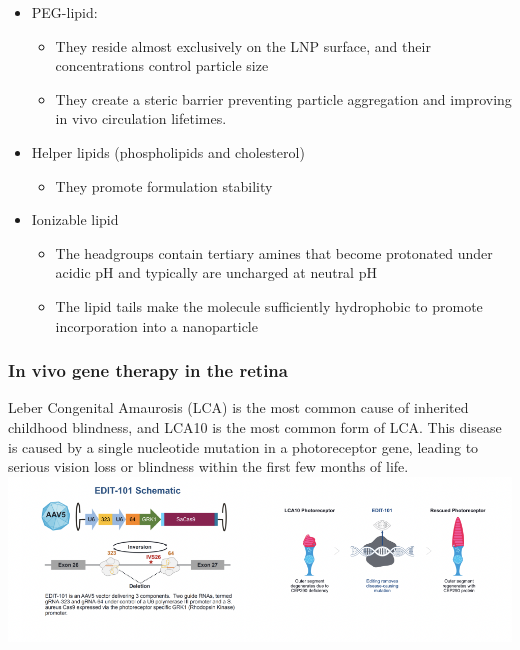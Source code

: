 \begin{itemize}
\begin{itemize}
\begin{itemize}
    \item PEG-lipid:
    \begin{itemize}
        \item They reside almost exclusively on the LNP surface, and
their concentrations control particle size
\item They create a steric barrier preventing particle
aggregation and improving in vivo circulation lifetimes.
    \end{itemize}
    \item Helper lipids (phospholipids and cholesterol)
    \begin{itemize}
        \item 
They promote formulation stability

    \end{itemize}
    \item Ionizable lipid
    \begin{itemize}
        \item  The headgroups contain tertiary amines that become
protonated under acidic pH and typically are uncharged at
neutral pH
\item The lipid tails make the molecule sufficiently hydrophobic
to promote incorporation into a nanoparticle
    \end{itemize}
\end{itemize}



\subsubsection{In vivo gene therapy in the retina}
Leber Congenital Amaurosis (LCA) is the most common cause of inherited childhood blindness, and
LCA10 is the most common form of LCA. This disease is caused by a single nucleotide mutation in
a photoreceptor gene, leading to serious vision loss or blindness within the first few months of life.
\includegraphics[width=1\textwidth]{Images/Edit101.png}\\[1cm]


\end{itemize}
\end{itemize}
